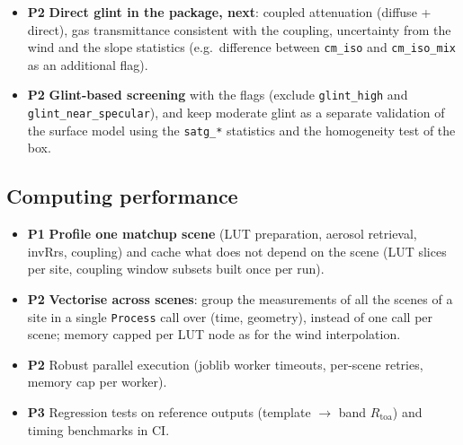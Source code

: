 \documentclass[11pt,a4paper]{article}
\newcommand{\Rtoa}{R_\mathrm{toa}}
\newcommand{\code}[1]{\texttt{#1}}
\newcommand{\prio}[1]{\textbf{\textcolor{blue!50!black}{#1}}}
\begin{document}
\begin{itemize}
  request after the simulation (Section~\ref{sec:glint_flags}).
\item \prio{P2} \textbf{Direct glint in the package, next}: coupled attenuation (diffuse + direct), gas
  transmittance consistent with the coupling, uncertainty from the wind and the slope statistics (e.g.\ difference
  between \code{cm\_iso} and \code{cm\_iso\_mix} as an additional flag).
\item \prio{P2} \textbf{Glint-based screening} with the flags (exclude \code{glint\_high} and
  \code{glint\_near\_specular}), and keep moderate glint as a separate validation of the surface model using the
  \code{satg\_*} statistics and the homogeneity test of the box.
\end{itemize}

\subsection{Computing performance}
\begin{itemize}
\item \prio{P1} \textbf{Profile one matchup scene} (LUT preparation, aerosol retrieval, invRrs, coupling) and cache
  what does not depend on the scene (LUT slices per site, coupling window subsets built once per run).
\item \prio{P2} \textbf{Vectorise across scenes}: group the measurements of all the scenes of a site in a single
  \code{Process} call over (time, geometry), instead of one call per scene; memory capped per LUT node as for the
  wind interpolation.
\item \prio{P2} Robust parallel execution (joblib worker timeouts, per-scene retries, memory cap per worker).
\item \prio{P3} Regression tests on reference outputs (template $\to$ band $\Rtoa$) and timing benchmarks in CI.
\end{itemize}
\end{document}
